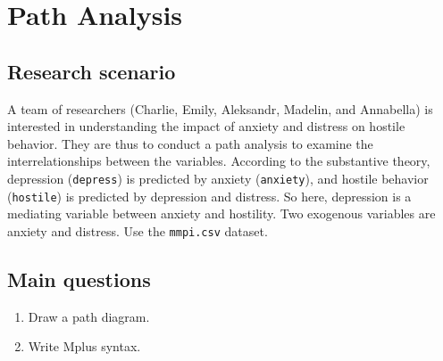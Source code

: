 \documentclass[
]{book}
\begin{document}
\hypertarget{path-analysis}{%
\chapter{Path Analysis}\label{path-analysis}}

\hypertarget{research-scenario}{%
\section{Research scenario}\label{research-scenario}}

A team of researchers (Charlie, Emily, Aleksandr, Madelin, and Annabella) is interested in understanding the impact of anxiety and distress on hostile behavior. They are thus to conduct a path analysis to examine the interrelationships between the variables. According to the substantive theory, depression (\texttt{depress}) is predicted by anxiety (\texttt{anxiety}), and hostile behavior (\texttt{hostile}) is predicted by depression and distress. So here, depression is a mediating variable between anxiety and hostility. Two exogenous variables are anxiety and distress. Use the \texttt{mmpi.csv} dataset.

\hypertarget{main-questions}{%
\section{Main questions}\label{main-questions}}

\begin{enumerate}
\def\labelenumi{\arabic{enumi}.}
\item
  Draw a path diagram.
\item
  Write Mplus syntax.
\end{enumerate}
\end{document}
